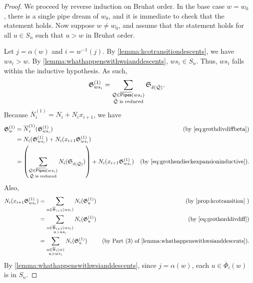 \documentclass[12 pt]{amsart}
\newcommand{\addable}{\alpha}
\numberwithin{equation}{section}
\theoremstyle{remark}
\newcommand{\kpipes}{\overline{\sf Pipes}}
\newcommand{\demprod}{\delta}
\newcommand{\divdiff}{N}
\newcommand{\kdivdiff}{\overline{N}}
\newcommand{\kcotransitionperms}{\overline{\Phi}}
\begin{document}
		\begin{proof}
			We proceed by reverse induction on Bruhat order. In the base case $w = w_0$, there is a single pipe dream of $w_0$, and it is immediate to check that the statement holds. 
			Now suppose $w \neq w_0$, and assume that the statement holds for all $u \in S_n$ such that $u > w$ in Bruhat order. 
			
			Let $j = \addable(w)$ and $i = w^{-1}(j)$. 
			By \cref{lemma:kcotransitiondescents}, we have $ws_i > w$. By \cref{lemma:whathappenswithwsianddescents}, $ws_i\in S_n$. Thus, $ws_i$ falls within the inductive hypothesis.
			As such,
			\begin{equation}
				\label{eq:grothendieckexpansioninductive}
				\mathfrak{G}_{ws_i}^{(1)} = \sum_{\substack{\mathcal{Q} \in \kpipes(ws_i)\\ \check{\mathcal{Q}} \text{ is reduced}}}\mathfrak{S}_{\demprod(\check{\mathcal{Q}})}.
			\end{equation}
			Because $\kdivdiff_i^{(1)} = \divdiff_i + \divdiff_i x_{i + 1}$, we have
			\begin{align*}
				\mathfrak{G}_w^{(1)}
				&= \kdivdiff_i^{(1)}(\mathfrak{G}_{ws_i}^{(1)}) & \text{(by \cref{eq:grothdivdiffbeta})}\\
				& = \divdiff_i(\mathfrak{G}_{ws_i}^{(1)}) + \divdiff_i (x_{i + 1}\mathfrak{G}_{ws_i}^{(1)})\\
				& = \left(\sum_{\substack{\mathcal{Q} \in \kpipes(ws_i)\\ \check{\mathcal{Q}} \text{ is reduced}}}\divdiff_i(\mathfrak{S}_{\demprod(\check{\mathcal{Q}})})\right) + \divdiff_i( x_{i + 1}\mathfrak{G}_{ws_i}^{(1)}) &\text{(by \cref{eq:grothendieckexpansioninductive})}.
			\end{align*}
			Also,
			\begin{align*}
				\divdiff_i( x_{i + 1}\mathfrak{G}_{ws_i}^{(1)})
				& = \sum_{u \in\kcotransitionperms_{i + 1}(ws_i)}\divdiff_i (\mathfrak{G}_u^{(1)} )&\text{(by \cref{prop:kcotransition} )}\\
				& = \sum_{\substack{u \in\kcotransitionperms_{i + 1}(ws_i)\\ u>us_i}}\divdiff_i (\mathfrak{G}_u^{(1)}) &\text{(by \cref{eq:grothorddivdiff})}\\
				& = \sum_{\substack{u \in\kcotransitionperms_{i}(w)\\u > ws_i}} N_i(\mathfrak{G}_u^{(1)}) & \text{(by Part (3) of \cref{lemma:whathappenswithwsianddescents})}.
			\end{align*}
			By \cref{lemma:whathappenswithwsianddescents}, since $j=\addable(w)$, each $u \in \kcotransitionperms_{i}(w)$ is in $S_n$. 

\end{proof}
\end{document}
